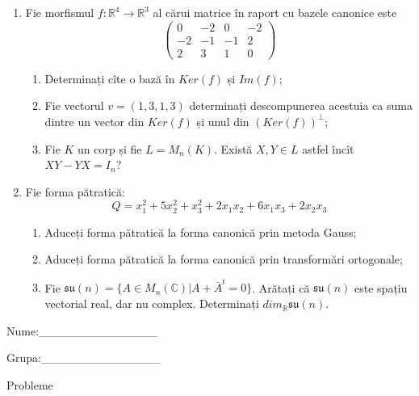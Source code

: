 \documentclass{article}
\begin{document}
\begin{enumerate}
 \item Fie morfismul $f:\mathbb{R}^4 \to \mathbb{R}^3$ al cărui matrice în raport cu bazele canonice este
$$\begin{pmatrix}
0&-2&0&-2\\
-2&-1&-1&2\\
2&3&1&0
\end{pmatrix}$$

\begin{enumerate}
\item Determinați cîte o bază în $Ker(f)$ și $Im(f)$;
\item Fie vectorul $v=(1,3,1,3)$ determinați descompunerea acestuia ca suma dintre un vector din $Ker(f)$ și unul din $(Ker(f))^\perp$;
\item Fie $K$ un corp și fie $L=M_n(K)$. Există $X,Y \in L$ astfel încît $XY-YX=I_n$?  
\end{enumerate}
\item Fie forma pătratică:
$$Q= x_1^2+5x_2^2+x_3^2+2x_1x_2+6x_1x_3+2x_2x_3$$

\begin{enumerate}
\item Aduceți forma pătratică la forma canonică prin metoda Gauss;
\item Aduceți forma pătratică la forma canonică prin transformări ortogonale;
\item Fie $\mathfrak{su}(n)=\{ A \in M_n(\mathbb{C}) | A+\bar{A}^t=0\}$. Arătați că $\mathfrak{su}(n)$ este spațiu vectorial real, dar nu complex.
Determinați $dim_{\mathbb{R}}\mathfrak{su}(n)$.
\end{enumerate}
\end{enumerate}
\newpage
\begin{flushright}
Nume:\_\_\_\_\_\_\_\_\_\_\_\_\_\_
 
 
Grupa:\_\_\_\_\_\_\_\_\_\_\_\_\_\_
\end{flushright}
\begin{center}
\vspace{2cm}
{\Large Probleme}
\vspace{2cm}
\end{center}
\end{document}
